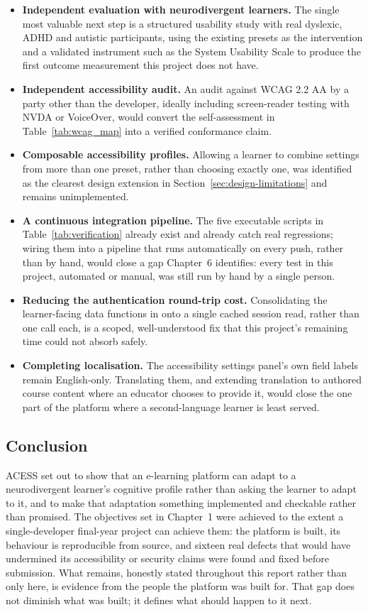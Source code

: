 \documentclass[12pt, oneside]{article} %
\newcommand{\tcode}[1]{\path{#1}}
\begin{document}
\begin{itemize}
    \item \textbf{Independent evaluation with neurodivergent learners.} The single most valuable next step is a structured usability study with real dyslexic, ADHD and autistic participants, using the existing presets as the intervention and a validated instrument such as the System Usability Scale \cite{brooke1996sus} to produce the first outcome measurement this project does not have.
    \item \textbf{Independent accessibility audit.} An audit against WCAG 2.2 AA by a party other than the developer, ideally including screen-reader testing with NVDA or VoiceOver, would convert the self-assessment in Table~\ref{tab:wcag_map} into a verified conformance claim.
    \item \textbf{Composable accessibility profiles.} Allowing a learner to combine settings from more than one preset, rather than choosing exactly one, was identified as the clearest design extension in Section~\ref{sec:design-limitations} and remains unimplemented.
    \item \textbf{A continuous integration pipeline.} The five executable scripts in Table~\ref{tab:verification} already exist and already catch real regressions; wiring them into a pipeline that runs automatically on every push, rather than by hand, would close a gap Chapter~6 identifies: every test in this project, automated or manual, was still run by hand by a single person.
    \item \textbf{Reducing the authentication round-trip cost.} Consolidating the learner-facing data functions in \tcode{learner-api.ts} onto a single cached session read, rather than one \tcode{auth.getUser()} call each, is a scoped, well-understood fix that this project's remaining time could not absorb safely.
    \item \textbf{Completing localisation.} The accessibility settings panel's own field labels remain English-only. Translating them, and extending translation to authored course content where an educator chooses to provide it, would close the one part of the platform where a second-language learner is least served.
\end{itemize}

\subsection{Conclusion}

ACESS set out to show that an e-learning platform can adapt to a neurodivergent learner's cognitive profile rather than asking the learner to adapt to it, and to make that adaptation something implemented and checkable rather than promised. The objectives set in Chapter~1 were achieved to the extent a single-developer final-year project can achieve them: the platform is built, its behaviour is reproducible from source, and sixteen real defects that would have undermined its accessibility or security claims were found and fixed before submission. What remains, honestly stated throughout this report rather than only here, is evidence from the people the platform was built for. That gap does not diminish what was built; it defines what should happen to it next.


\newpage


\end{document}
